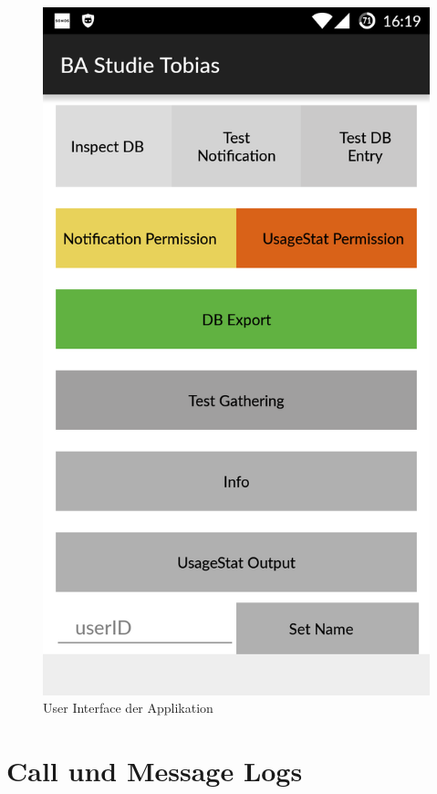 \begin{figure}[h]
    \centering
    \includegraphics{images/screenshot1.png}
    \caption{User Interface der Applikation}
    \label{fig:uiscreen}
\end{figure}

\section{Call und Message Logs}

